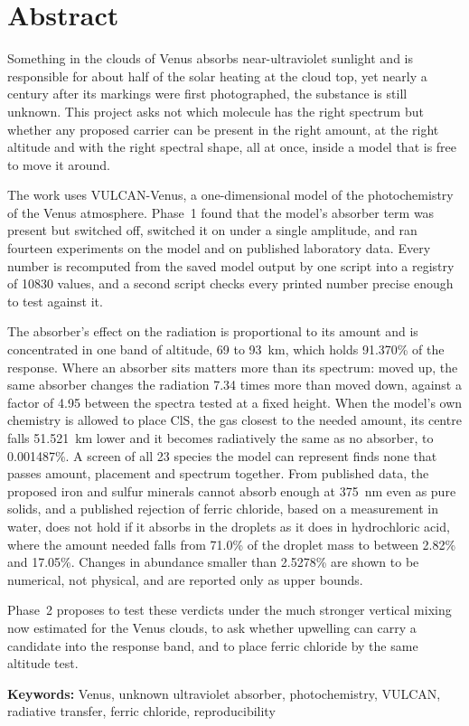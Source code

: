 \chapter*{Abstract}
{}
\begingroup{}

Something in the clouds of Venus absorbs near-ultraviolet sunlight and is responsible for
about half of the solar heating at the cloud top, yet nearly a century after its markings
were first photographed, the substance is still unknown. This project asks not which
molecule has the right spectrum but whether any proposed carrier can be present in
the right amount, at the right altitude and with the right spectral shape, all at once,
inside a model that is free to move it around.

The work uses VULCAN-Venus, a one-dimensional model of the photochemistry of the Venus
atmosphere. Phase~1 found that the model's absorber term was present but switched off,
switched it on under a single amplitude, and ran fourteen experiments on the model and
on published laboratory data. Every number is
recomputed from the saved model output by one script into a registry of 10830 values,
and a second script checks every printed number precise enough to test against it.

The absorber's effect on the radiation is proportional to its amount and is concentrated
in one band of altitude, 69 to 93~km, which holds 91.370\% of the response. Where an
absorber sits matters more than its spectrum: moved up, the same absorber changes the
radiation 7.34 times more than moved down, against a factor of 4.95 between the
spectra tested at a fixed height. When the model's own chemistry is allowed to place
ClS, the gas closest to the needed amount, its centre falls 51.521~km lower and
it becomes radiatively the same as no absorber, to 0.001487\%. A screen of all 23
species the model can represent finds none that passes amount, placement and spectrum
together. From published data, the proposed iron and sulfur minerals cannot absorb enough at 375~nm even as pure solids, and a
published rejection of ferric chloride, based on a measurement in water, does not hold
if it absorbs in the droplets as it does in hydrochloric acid, where the amount needed
falls from 71.0\% of the droplet mass to between 2.82\% and 17.05\%. Changes in
abundance smaller than 2.5278\% are shown to be numerical, not physical, and are
reported only as upper bounds.

Phase~2 proposes to test these verdicts under the much stronger vertical mixing now
estimated for the Venus clouds, to ask whether upwelling can carry a candidate into the
response band, and to place ferric chloride by the same altitude test.

\textbf{Keywords:} Venus, unknown ultraviolet absorber, photochemistry, VULCAN,
radiative transfer, ferric chloride, reproducibility
\par\endgroup
